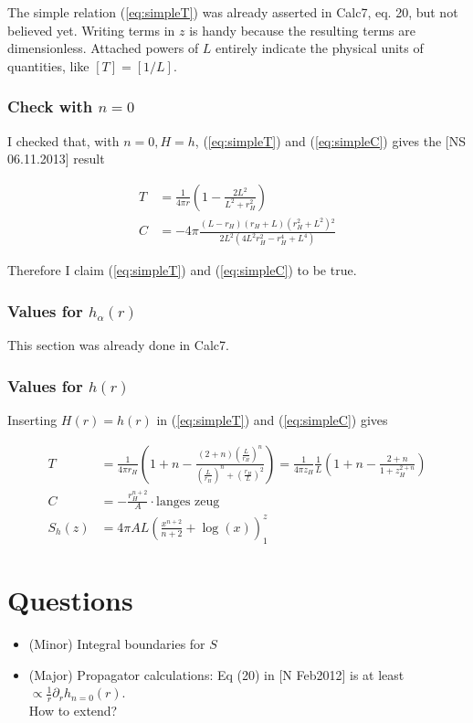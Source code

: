 \documentclass[10pt,a4paper, fleqn]{article}
\begin{document}
The simple relation (\ref{eq:simpleT}) was already asserted in Calc7, eq. 20, but not believed yet. Writing terms in $z$ is handy because the resulting terms are dimensionless. Attached powers of $L$ entirely indicate the physical units of quantities, like $[T]=[1/L]$.

\subsubsection{Check with $n=0$}
I checked that, with $n=0, H=h$, (\ref{eq:simpleT}) and (\ref{eq:simpleC}) gives the [NS 06.11.2013] result

\begin{align}
T &= \frac{1}{4 \pi r}\left( 1 - \frac{2 L^2}{L^2 + r_H^2} \right) \\
C &= %
- 4 \pi \frac{\left(L-r_H\right) \left(r_H+L\right) \left(r_H^2+L^2\right){}^2}{2 L^2 \left(4 L^2 r_H^2-r_H^4+L^4\right)}
\end{align}

Therefore I claim (\ref{eq:simpleT}) and (\ref{eq:simpleC}) to be true.

\subsubsection{Values for $h_\alpha(r)$}
This section was already done in Calc7.

\subsubsection{Values for $h(r)$}
Inserting $H(r)=h(r)$ in (\ref{eq:simpleT}) and (\ref{eq:simpleC}) gives

\begin{align}
\label{eq:hT} T &= \frac{1}{4\pi r_H} \left( 1 + n - \frac{(2+n) \left(\frac L{r_H}\right)^n}{\left(\frac L{r_H}\right)^n + \left(\frac {r_H}L\right)^2} \right) = \frac 1{4\pi z_H} \frac 1L \left( 1+n - \frac{2+n}{1 + z_H^{2+n}}\right)\\
\label{eq:hC} C &= -\frac{r_H^{n+2}}{A} \cdot \text{langes zeug} \\
S_h(z) &= 4 \pi  A L \left(\frac{x^{n+2}}{n+2} + \log
   (x)\right)_1^z
\end{align}


\section{Questions}
\begin{itemize}
\item (Minor) Integral boundaries for $S$
\item (Major) Propagator calculations: Eq (20) in [N Feb2012] is at least $\propto \frac 1r \partial_r h_{n=0}(r)$. \\ How to extend?


\end{itemize}
\end{document}
